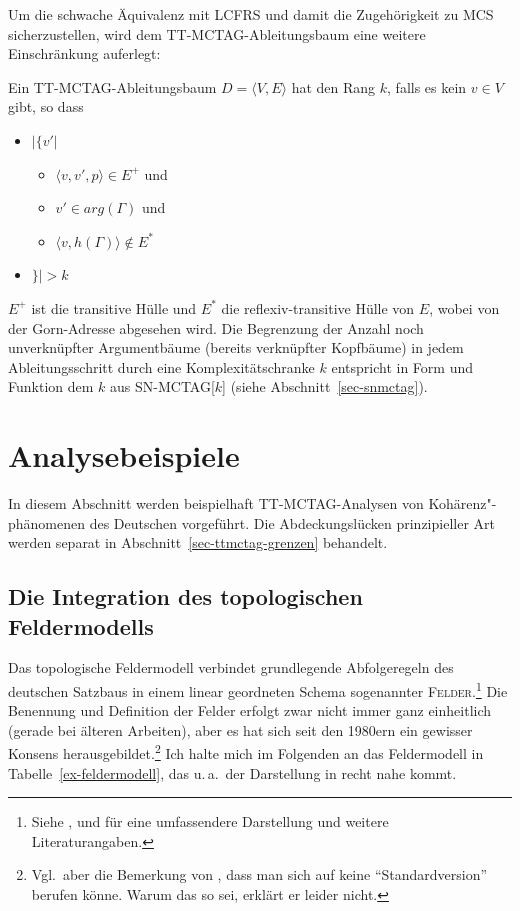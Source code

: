 Um die schwache Äquivalenz mit LCFRS und damit die Zugehörigkeit zu MCS sicherzustellen, wird dem TT-MCTAG-Ableitungsbaum eine weitere Einschränkung auferlegt:
\begin{definition}[$k$-TT-MCTAG] Ein TT-MCTAG-Ableitungsbaum $D = \langle V,E \rangle$ hat den Rang $k$, falls es kein $v \in V$ gibt, so dass
\begin{itemize}
  \item[] $|\{ v'| $ 
  \begin{itemize}
  \item[]$\langle v,v',p\rangle \in E^+ $ und 
  \item[]$v' \in arg(\Gamma)$ und 
  \item[]$ \langle v,h(\Gamma)\rangle \not\in E^*$ 
  \end{itemize} 
  \item[]$\}|  > k$  
\end{itemize}
\end{definition}
$E^+$ ist die transitive Hülle und $E^*$ die reflexiv-transitive Hülle von $E$, wobei von der Gorn-Adresse abgesehen wird.
Die Begrenzung der Anzahl noch unverknüpfter Argumentbäume (bereits verknüpfter Kopfbäume) in jedem Ableitungsschritt durch eine Komplexitätschranke $k$ entspricht in Form und Funktion dem $k$ aus SN-MCTAG[$k$] (siehe Abschnitt~\ref{sec-snmctag}).  

\section{Analysebeispiele} \label{sec-ttmctag-beispiele}

In diesem Abschnitt werden beispielhaft TT-MCTAG-Analysen von Kohärenz"-phänomenen des Deutschen vorgeführt. Die Abdeckungslücken prinzipieller Art werden separat in Abschnitt~\ref{sec-ttmctag-grenzen} behandelt. 

\subsection{Die Integration des topologischen Feldermodells}\label{sec-feldermodell}

Das topologische Feldermodell verbindet grundlegende Abfolgeregeln des deut\-schen Satzbaus in einem linear geordneten Schema sogenannter \textsc{Felder}.\footnote{Siehe \cite{Reis:80}, \cite{Askedal:86} und \cite{Hoehle:86} für eine umfassendere Darstellung und weitere Literaturangaben.} Die Benennung und Definition der Felder erfolgt zwar nicht immer ganz einheitlich (gerade bei älteren Arbeiten), aber es hat sich seit den 1980ern ein gewisser Konsens herausgebildet.\footnote{Vgl.\ aber die Bemerkung von \citet[286]{Sternefeld:06}, dass man sich auf keine "`Standardversion"' berufen könne. Warum das so sei, erklärt er leider nicht.} Ich halte mich im Folgenden an das  Feldermodell in Tabelle~\ref{ex-feldermodell}, das u.\,a.\ der Darstellung in \citet[216ff]{Askedal:86} recht nahe kommt. 

